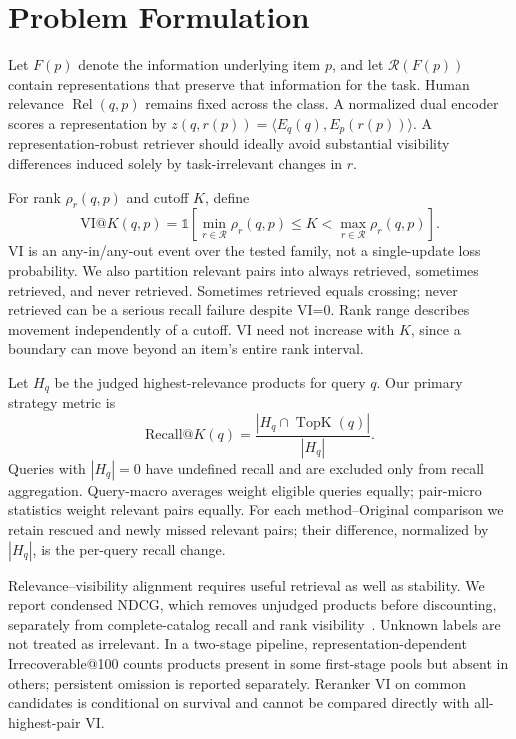 \section{Problem Formulation}
Let $F(p)$ denote the information underlying item $p$, and let $\mathcal R(F(p))$ contain representations that preserve that information for the task. Human relevance $\operatorname{Rel}(q,p)$ remains fixed across the class. A normalized dual encoder scores a representation by $z(q,r(p))=\langle E_q(q),E_p(r(p))\rangle$. A representation-robust retriever should ideally avoid substantial visibility differences induced solely by task-irrelevant changes in $r$.

For rank $\rho_r(q,p)$ and cutoff $K$, define
\begin{equation}
\mathrm{VI}@K(q,p)=\mathbb{1}\left[\min_{r\in\mathcal R}\rho_r(q,p)\le K<\max_{r\in\mathcal R}\rho_r(q,p)\right].
\end{equation}
VI is an any-in/any-out event over the tested family, not a single-update loss probability. We also partition relevant pairs into always retrieved, sometimes retrieved, and never retrieved. Sometimes retrieved equals crossing; never retrieved can be a serious recall failure despite VI=0. Rank range describes movement independently of a cutoff. VI need not increase with $K$, since a boundary can move beyond an item's entire rank interval.

Let $H_q$ be the judged highest-relevance products for query $q$. Our primary strategy metric is
\begin{equation}
\mathrm{Recall}@K(q)=\frac{|H_q\cap\operatorname{TopK}(q)|}{|H_q|}.
\end{equation}
Queries with $|H_q|=0$ have undefined recall and are excluded only from recall aggregation. Query-macro averages weight eligible queries equally; pair-micro statistics weight relevant pairs equally. For each method--Original comparison we retain rescued and newly missed relevant pairs; their difference, normalized by $|H_q|$, is the per-query recall change.

Relevance--visibility alignment requires useful retrieval as well as stability. We report condensed NDCG, which removes unjudged products before discounting, separately from complete-catalog recall and rank visibility~\cite{jarvelin2002cumulated,sakai2008alternatives}. Unknown labels are not treated as irrelevant. In a two-stage pipeline, representation-dependent Irrecoverable@100 counts products present in some first-stage pools but absent in others; persistent omission is reported separately. Reranker VI on common candidates is conditional on survival and cannot be compared directly with all-highest-pair VI.
